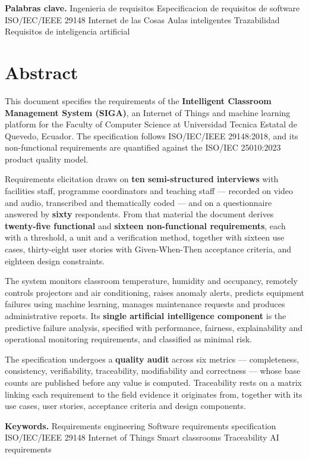 \documentclass[11pt,a4paper]{article}
\begin{document}
\medskip
\noindent\textbf{Palabras clave.} Ingenieria de requisitos \textbullet{} Especificacion
de requisitos de software \textbullet{} ISO/IEC/IEEE 29148 \textbullet{} Internet de las
Cosas \textbullet{} Aulas inteligentes \textbullet{} Trazabilidad \textbullet{}
Requisitos de inteligencia artificial

\newpage

\section*{Abstract}

This document specifies the requirements of the \textbf{Intelligent Classroom Management
System (SIGA)}, an Internet of Things and machine learning platform for the Faculty of
Computer Science at Universidad Tecnica Estatal de Quevedo, Ecuador. The specification
follows ISO/IEC/IEEE 29148:2018, and its non-functional requirements are quantified
against the ISO/IEC 25010:2023 product quality model.

Requirements elicitation draws on \textbf{ten semi-structured interviews} with facilities
staff, programme coordinators and teaching staff --- recorded on video and audio,
transcribed and thematically coded --- and on a questionnaire answered by \textbf{sixty}
respondents. From that material the document derives \textbf{twenty-five functional} and
\textbf{sixteen non-functional requirements}, each with a threshold, a unit and a
verification method, together with sixteen use cases, thirty-eight user stories with
Given-When-Then acceptance criteria, and eighteen design constraints.

The system monitors classroom temperature, humidity and occupancy, remotely controls
projectors and air conditioning, raises anomaly alerts, predicts equipment failures using
machine learning, manages maintenance requests and produces administrative reports. Its
\textbf{single artificial intelligence component} is the predictive failure analysis,
specified with performance, fairness, explainability and operational monitoring
requirements, and classified as minimal risk.

The specification undergoes a \textbf{quality audit} across six metrics --- completeness,
consistency, verifiability, traceability, modifiability and correctness --- whose base
counts are published before any value is computed. Traceability rests on a matrix linking
each requirement to the field evidence it originates from, together with its use cases,
user stories, acceptance criteria and design components.

\medskip
\noindent\textbf{Keywords.} Requirements engineering \textbullet{} Software requirements
specification \textbullet{} ISO/IEC/IEEE 29148 \textbullet{} Internet of Things
\textbullet{} Smart classrooms \textbullet{} Traceability \textbullet{} AI requirements

\newpage
\tableofcontents
\newpage
\listoftables
\newpage
\listoffigures
\newpage


\end{document}
